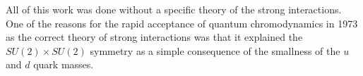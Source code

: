 All of this work was done without a specific theory of the strong interactions. One of the reasons for the rapid acceptance of quantum chromodynamics in 1973 as the correct theory of strong interactions was that it explained the $SU(2)\times SU(2)$ symmetry as a simple consequence of the smallness of the $u$ and $d$ quark masses.
